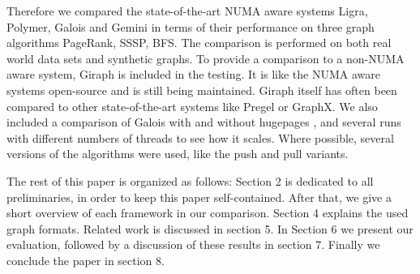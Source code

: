 Therefore we compared the state-of-the-art NUMA aware systems Ligra, Polymer, Galois and Gemini in terms of their performance on three graph algorithms PageRank, SSSP, BFS.
The comparison is performed on both real world data sets and synthetic graphs.
To provide a comparison to a non-NUMA aware system, Giraph is included in the testing.
It is like the NUMA aware systems open-source and is still being maintained.
Giraph itself has often been compared to other state-of-the-art systems like Pregel or GraphX.
We also included a comparison of Galois with and without hugepages \cite{hugepages}, and several runs with different numbers of threads to see how it scales.
Where possible, several versions of the algorithms were used, like the push and pull variants.

The rest of this paper is organized as follows:
Section 2 is dedicated to all preliminaries, in order to keep this paper self-contained.
After that, we give a short overview of each framework in our comparison.
Section 4 explains the used graph formats.
Related work is discussed in section 5.
In Section 6 we present our evaluation, followed by a discussion of these results in section 7. Finally we conclude the paper in section 8.
